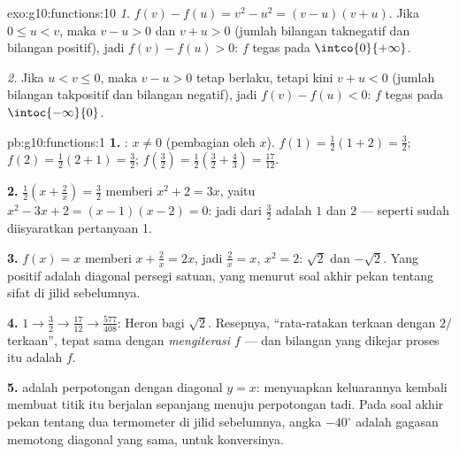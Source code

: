 \begin{solution}{exo:g10:functions:10}
\emph{1.} $f(v) - f(u) = v^2 - u^2 = (v-u)(v+u)$. Jika $0 \leq u < v$, maka
$v - u > 0$ dan $v + u > 0$ (jumlah bilangan taknegatif dan bilangan positif),
jadi $f(v) - f(u) > 0$: $f$ tegas  pada $\intco{0}{+\infty}$.

\emph{2.} Jika $u < v \leq 0$, maka $v - u > 0$ tetap berlaku, tetapi kini
$v + u < 0$ (jumlah bilangan takpositif dan bilangan negatif), jadi
$f(v) - f(u) < 0$: $f$ tegas  pada $\intoc{-\infty}{0}$.
\end{solution}

\begin{solution}{pb:g10:functions:1}
\textbf{1.} : $x \neq 0$ (pembagian oleh $x$). $f(1) =
\frac12(1 + 2) = \frac32$; $f(2) = \frac12(2 + 1) = \frac32$;
$f\!\left(\frac32\right) = \frac12\left(\frac32 +
\frac43\right) = \frac{17}{12}$.

\textbf{2.} $\frac12\left(x + \frac2x\right) = \frac32$ memberi
$x^2 + 2 = 3x$, yaitu $x^2 - 3x + 2 = (x - 1)(x - 2) = 0$: jadi
 dari $\frac32$ adalah $1$ dan $2$ --- seperti sudah
diisyaratkan pertanyaan 1.

\textbf{3.} $f(x) = x$ memberi $x + \frac2x = 2x$, jadi
$\frac2x = x$, $x^2 = 2$:  $\sqrt2$ dan $-\sqrt2$.
Yang positif adalah diagonal persegi satuan, yang 
menurut soal akhir pekan tentang sifat  di jilid sebelumnya.

\textbf{4.} $1 \to \frac32 \to \frac{17}{12} \to
\frac{577}{408}$:  Heron bagi $\sqrt2$. Resepnya,
``rata-ratakan terkaan dengan $2/$terkaan'', tepat sama dengan
\emph{mengiterasi  $f$} --- dan bilangan yang dikejar
proses itu adalah  $f$.

\textbf{5.}  adalah perpotongan 
dengan diagonal $y = x$: menyuapkan keluarannya kembali membuat
titik itu berjalan sepanjang  menuju perpotongan tadi. Pada
soal akhir pekan tentang dua termometer di jilid sebelumnya, angka
$-40^\circ$ adalah gagasan memotong diagonal yang sama, untuk 
konversinya.


\end{solution}
